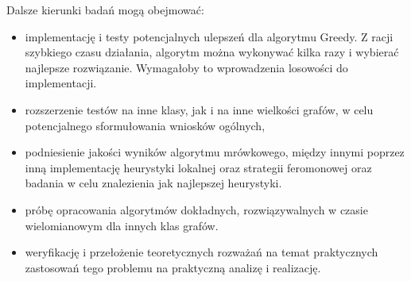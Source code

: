 Dalsze kierunki badań mogą obejmować:
\begin{itemize}
    \item implementację i testy potencjalnych ulepszeń dla algorytmu Greedy. Z racji szybkiego czasu działania, algorytm można wykonywać kilka razy i wybierać najlepsze rozwiązanie. Wymagałoby to wprowadzenia losowości do implementacji.
    \item rozszerzenie testów na inne klasy, jak i na inne wielkości grafów, w celu potencjalnego sformułowania wniosków ogólnych,
    \item podniesienie jakości wyników algorytmu mrówkowego, między innymi poprzez inną implementację heurystyki lokalnej oraz strategii feromonowej oraz badania w celu znalezienia jak najlepszej heurystyki.
    \item próbę opracowania algorytmów dokładnych, rozwiązywalnych w czasie wielomianowym dla innych klas grafów.
    \item weryfikację i przełożenie teoretycznych rozważań na temat praktycznych zastosowań tego problemu na praktyczną analizę i realizację.
\end{itemize}

